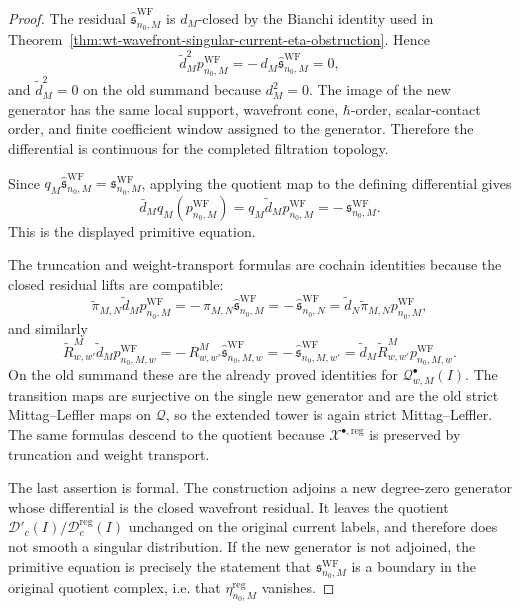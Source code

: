 \begin{proof}
  The residual
  \(\widehat{\mathfrak s}^{\mathrm{WF}}_{n_0,M}\) is \(d_M\)-closed by the
  Bianchi identity used in
  Theorem~\ref{thm:wt-wavefront-singular-current-eta-obstruction}.  Hence
  \[
    \widetilde d_M^2p^{\mathrm{WF}}_{n_0,M}
      =
    -\,d_M\widehat{\mathfrak s}^{\mathrm{WF}}_{n_0,M}=0,
  \]
  and \(\widetilde d_M^2=0\) on the old summand because \(d_M^2=0\).
  The image of the new generator has the same local support,
  wavefront cone, \(\hbar\)-order, scalar-contact order, and finite
  coefficient window assigned to the generator.  Therefore the
  differential is continuous for the completed filtration topology.

  Since
  \(q_M\widehat{\mathfrak s}^{\mathrm{WF}}_{n_0,M}
  =\mathfrak s^{\mathrm{WF}}_{n_0,M}\), applying the quotient map to the
  defining differential gives
  \[
    \bar d_Mq_M(p^{\mathrm{WF}}_{n_0,M})
      =
    q_M\widetilde d_Mp^{\mathrm{WF}}_{n_0,M}
      =
    -\,\mathfrak s^{\mathrm{WF}}_{n_0,M}.
  \]
  This is the displayed primitive equation.

  The truncation and weight-transport formulas are cochain identities
  because the closed residual lifts are compatible:
  \[
    \widetilde\pi_{M,N}\widetilde d_Mp^{\mathrm{WF}}_{n_0,M}
      =
    -\,\pi_{M,N}\widehat{\mathfrak s}^{\mathrm{WF}}_{n_0,M}
      =
    -\,\widehat{\mathfrak s}^{\mathrm{WF}}_{n_0,N}
      =
    \widetilde d_N\widetilde\pi_{M,N}p^{\mathrm{WF}}_{n_0,M},
  \]
  and similarly
  \[
    \widetilde R^M_{w,w'}\widetilde d_Mp^{\mathrm{WF}}_{n_0,M,w}
      =
    -\,R^M_{w,w'}\widehat{\mathfrak s}^{\mathrm{WF}}_{n_0,M,w}
      =
    -\,\widehat{\mathfrak s}^{\mathrm{WF}}_{n_0,M,w'}
      =
    \widetilde d_M\widetilde R^M_{w,w'}
      p^{\mathrm{WF}}_{n_0,M,w}.
  \]
  On the old summand these are the already proved identities for
  \(\mathcal Q^\bullet_{w,M}(I)\).  The transition maps are surjective on
  the single new generator and are the old strict Mittag--Leffler maps on
  \(\mathcal Q\), so the extended tower is again strict
  Mittag--Leffler.  The same formulas descend to the quotient because
  \(\mathcal X^{\bullet,\mathrm{reg}}\) is preserved by truncation and
  weight transport.

  The last assertion is formal.  The construction adjoins a new
  degree-zero generator whose differential is the closed wavefront
  residual.  It leaves the quotient
  \(\mathcal D'_c(I)/\mathcal D^{\mathrm{reg}}_c(I)\) unchanged on the
  original current labels, and therefore does not smooth a singular
  distribution.  If the new generator is not adjoined, the primitive
  equation is precisely the statement that
  \(\mathfrak s^{\mathrm{WF}}_{n_0,M}\) is a boundary in the original
  quotient complex, i.e. that
  \(\eta^{\mathrm{reg}}_{n_0,M}\) vanishes.
\end{proof}

